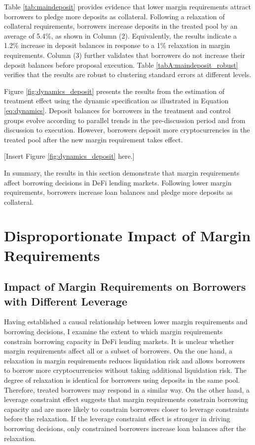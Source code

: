 \documentclass[12pt]{article}
\begin{document}
Table \ref{tab:maindeposit} provides evidence that lower margin requirements attract borrowers to pledge more deposits as collateral. Following a relaxation of collateral requirements, borrowers increase deposits in the treated pool by an average of 5.4\%, as shown in Column (2). Equivalently, the results indicate a 1.2\% increase in deposit balances in response to a 1\% relaxation in margin requirements. Column (3) further validates that borrowers do not increase their deposit balances before proposal execution. Table \ref{tabA:maindeposit_robust} verifies that the results are robust to clustering standard errors at different levels.

 Figure \ref{fig:dynamics_deposit} presents the results from the estimation of treatment effect using the dynamic specification as illustrated in Equation \ref{eq:dynamics}. Deposit balances for borrowers in the treatment and control groups evolve according to parallel trends in the pre-discussion period and from discussion to execution. However, borrowers deposit more cryptocurrencies in the treated pool after the new margin requirement takes effect. 


\centerline{[Insert Figure \ref{fig:dynamics_deposit} here.]}

In summary, the results in this section demonstrate that margin requirements affect borrowing decisions in DeFi lending markets. Following lower margin requirements, borrowers increase loan balances and pledge more deposits as collateral.

\section{Disproportionate Impact of Margin Requirements}\label{sec:lev_constraints}

\subsection{Impact of Margin Requirements on Borrowers with Different Leverage}
Having established a causal relationship between lower margin requirements and borrowing decisions, I examine the extent to which margin requirements constrain borrowing capacity in DeFi lending markets. It is unclear whether margin requirements affect all or a subset of borrowers. On the one hand, a relaxation in margin requirements reduces liquidation risk and allows borrowers to borrow more cryptocurrencies without taking additional liquidation risk. The degree of relaxation is identical for borrowers using deposits in the same pool. Therefore, treated borrowers may respond in a similar way. On the other hand, a leverage constraint effect suggests that margin requirements constrain borrowing capacity and are more likely to constrain borrowers closer to leverage constraints before the relaxation. If the leverage constraint effect is stronger in driving borrowing decisions, only constrained borrowers increase loan balances after the relaxation. 
\end{document}

